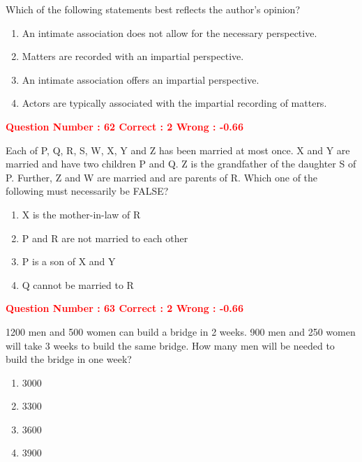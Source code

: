 \documentclass[12pt]{article}
\begin{document}
{Which of the following statements best reflects the author’s opinion?

\begin{enumerate}[label=(\Alph*)]
    \item An intimate association does not allow for the necessary perspective.
    \item Matters are recorded with an impartial perspective.
    \item An intimate association offers an impartial perspective.
    \item Actors are typically associated with the impartial recording of matters.
\end{enumerate}

\vspace{1em}

\newpage

\textcolor{red}{\textbf{Question Number : 62 \hfill Correct : 2  Wrong : -0.66}}

\vspace{0.5em}

Each of P, Q, R, S, W, X, Y and Z has been married at most once. X and Y are married and have two children P and Q. Z is the grandfather of the daughter S of P. Further, Z and W are married and are parents of R. Which one of the following must necessarily be FALSE?

\begin{enumerate}[label=(\Alph*)]
    \item X is the mother-in-law of R
    \item P and R are not married to each other
    \item P is a son of X and Y
    \item Q cannot be married to R
\end{enumerate}

\vspace{1em}


\textcolor{red}{\textbf{Question Number : 63 \hfill Correct : 2  Wrong : -0.66}}

\vspace{0.5em}

1200 men and 500 women can build a bridge in 2 weeks. 900 men and 250 women will take 3 weeks to build the same bridge. How many men will be needed to build the bridge in one week?

\begin{enumerate}[label=(\Alph*)]
    \item 3000
    \item 3300
    \item 3600
    \item 3900
\end{enumerate}

}
\end{document}
